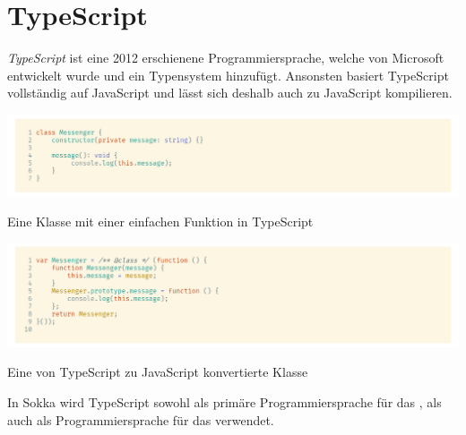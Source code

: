 \section{TypeScript}
\label{typescript}

\textit{TypeScript} ist eine 2012 erschienene Programmiersprache, welche von Microsoft entwickelt wurde und \textit{} ein Typensystem hinzufügt. Ansonsten basiert TypeScript vollständig auf JavaScript und lässt sich deshalb auch zu JavaScript kompilieren.

\begin{code}[htp]
    \begin{center}
        \includegraphics[width=1\textwidth]{images/TypeScript/TS.png}
        \vspace{-25pt}
        \caption{Eine Klasse mit einer einfachen Funktion in TypeScript}
    \end{center}
\end{code}

\begin{code}[htp]
    \begin{center}
        \includegraphics[width=1\textwidth]{images/TypeScript/JS.png}
        \vspace{-25pt}
        \caption{Eine von TypeScript zu JavaScript konvertierte Klasse}
    \end{center}
\end{code}

In Sokka wird TypeScript sowohl als primäre Programmiersprache für das , als auch als Programmiersprache für das  verwendet.